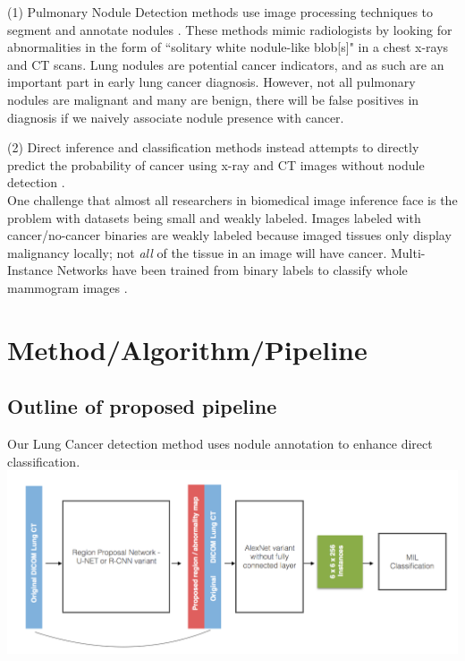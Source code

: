\documentclass[twocolumn,10pt]{article}
\newcommand{\red}[1]{{\color{red}#1}}
\newcommand{\temp}[1]{{\red{#1}\\}}
\begin{document}
(1) Pulmonary Nodule Detection methods use 
image processing techniques to segment and annotate nodules
\cite{FeatureBasedLungNoduleDetection_2017, 
     LungNoduleDetectionWeaklyLabeled_2016, U-net_2015}. These methods
mimic radiologists by looking for abnormalities in the form of
``solitary white nodule-like blob[s]" in a chest x-rays and CT scans.
Lung nodules are potential cancer indicators, and as such are an important part 
in early lung cancer diagnosis. However, not all pulmonary nodules are malignant
and many are benign, there will be false positives in diagnosis if we naively
associate nodule presence with cancer. 

(2) Direct inference and classification methods
instead attempts to directly predict the probability of cancer using x-ray and
CT images without nodule detection
\cite{Kuruvilla_2013, classificationOfNodules_2016}. \\

One challenge that almost all researchers in biomedical image inference face is 
the problem with datasets being small and weakly labeled. Images labeled with
cancer/no-cancer binaries are weakly labeled because imaged tissues only display
malignancy locally; not \textit{all} of the tissue in an image will have cancer.
Multi-Instance Networks have been trained from binary labels to classify whole
mammogram images
\cite{Maron:1998:FML:302528.302753}.

\section{Method/Algorithm/Pipeline}


\subsection{Outline of proposed pipeline}
Our Lung Cancer detection method uses nodule annotation to enhance direct
classification. 
\includegraphics[width=\columnwidth]{img/architecture.png}
\end{document}
